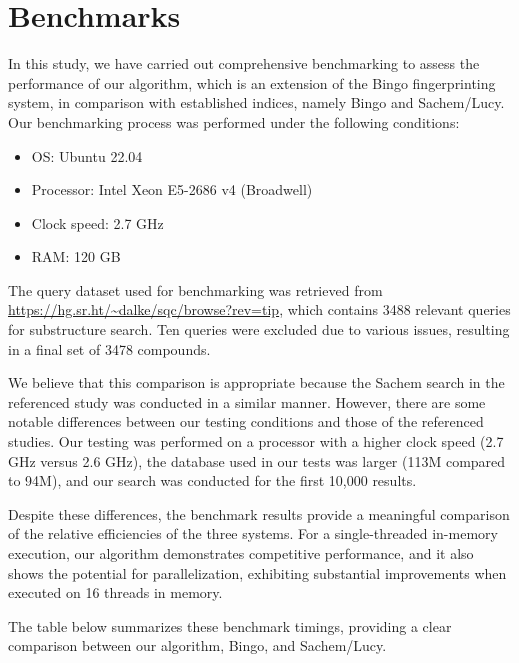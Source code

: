 \section{Benchmarks}

In this study, we have carried out comprehensive benchmarking to assess the performance of our algorithm, which is an extension 
of the Bingo fingerprinting system, in comparison with established indices, namely Bingo and Sachem/Lucy. Our benchmarking process 
was performed under the following conditions:

\begin{itemize}
\item OS: Ubuntu 22.04
\item Processor: Intel Xeon E5-2686 v4 (Broadwell)
\item Clock speed: 2.7 GHz
\item RAM: 120 GB
\end{itemize}

The query dataset used for benchmarking was retrieved from \url{https://hg.sr.ht/~dalke/sqc/browse?rev=tip}, which contains 3488 
relevant queries for substructure search. Ten queries were excluded due to various issues, resulting in a final set of 3478 compounds.

We believe that this comparison is appropriate because the Sachem search in the referenced study was conducted in a similar manner. 
However, there are some notable differences between our testing conditions and those of the referenced studies. Our testing was 
performed on a processor with a higher clock speed (2.7 GHz versus 2.6 GHz), the database used in our tests was larger (113M 
compared to 94M), and our search was conducted for the first 10,000 results.

Despite these differences, the benchmark results provide a meaningful comparison of the relative efficiencies of the three systems. 
For a single-threaded in-memory execution, our algorithm demonstrates competitive performance, and it also shows the potential for 
parallelization, exhibiting substantial improvements when executed on 16 threads in memory.

The table below summarizes these benchmark timings, providing a clear comparison between our algorithm, Bingo, and Sachem/Lucy.

